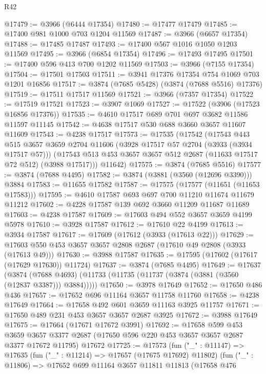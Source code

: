 \begin{lexlean}{R42}
\begin{coremodule}
@17479 := @3966 (@6444 @17354)
@17480 := @17477 @17479
@17485 := @17400 @981 @1000 @703 @1204 @11569
@17487 := @3966 (@6657 @17354)
@17488 := @17485 @17487
@17493 := @17400 @567 @1016 @1050 @1203 @11569
@17495 := @3966 (@6854 @17354)
@17496 := @17493 @17495
@17501 := @17400 @596 @413 @700 @1202 @11569
@17503 := @3966 (@7155 @17354)
@17504 := @17501 @17503
@17511 := @3941 @17376 @17354 @754 @1069 @703 @1201 @16856
@17517 := @3874 (@7685 @5428) (@3874 (@7688 @5516) @17376)
@17519 := @17511 @17517 @11569
@17521 := @3966 (@7357 @17354)
@17522 := @17519 @17521
@17523 := @3907 @1069
@17527 := @17522 (@3906 (@17523 @16856 @17376))
@17535 := @4610 @17517 @689 @701 @697 @3682 @11586 @11597 @11145
@17542 := @4638 @17517 @530 @688 @3660 @3657 @11607 @11609
@17543 := @4238 @17517
@17573 := @17535
    (@17542
      (@17543
        @443
        @515
        @3657
        @3659
        @2704
        @11606
        (@3928 @17517 @57 @2704 (@3933 (@3934 @17517 @57)))
        (@17543 @513 @453 @3657 @3657 @512 @2687 (@11633 @17517 @72 @512) (@3988 @17517)))
      @11642)
@17575 := @3874 (@7685 @5516)
@17577 := @3874 (@7688 @4495)
@17582 := @3874 (@3881 (@3560 (@12696 @3390))) @3884
@17583 := @11655 @17582
@17587 := @17575 (@17577 (@11651 (@11653 @17583)))
@17595 := @4610 @17587 @693 @697 @700 @11210 @11674 @11679 @11212
@17602 := @4228 @17587 @139 @692 @3660 @11209 @11687 @11689
@17603 := @4238 @17587
@17609 := @17603 @494 @552 @3657 @3659 @4199 @5978
@17610 := @3928 @17587
@17612 := @17610 @22 @4199
@17613 := @3934 @17587
@17617 := @17609 (@17612 (@3933 (@17613 @22)))
@17629 := @17603 @550 @453 @3657 @3657 @2808 @2687 (@17610 @49 @2808 (@3933 (@17613 @49)))
@17630 := @3988 @17587
@17635 := @17595 (@17602 (@17617 (@17629 @17630)) @11724)
@17637 := @3874 (@7685 @4495)
@17649 := @17637
    (@3874 (@7688 @4693) (@11733 (@11735 (@11737 (@3874 (@3881 (@3560 (@12837 @3387))) @3884)))))
@17650 := @3978 @17649
@17652 := @17650 @486 @436
@17657 := @17652 @696 @11164 @3657 @11758 @11760
@17658 := @4238 @17649
@17664 := @17658 @492 @601 @3659 @11163 @3925 @11757
@17671 := @17650 @489 @231 @453 @3657 @3657 @2687 @3925
@17672 := @3988 @17649
@17675 := @17664 (@17671 @17672 @3991)
@17692 := @17658
    @599
    @453
    @3659
    @3657
    @3377
    @2687
    (@17650 @596 @220 @453 @3657 @3657 @2687 @3377 @17672 @11795)
    @17672
@17725 := @17573
    (fun ("_" : @11147) =>
    @17635
      (fun ("_" : @11214) => @17657 (@17675 @17692) @11802)
      (fun ("_" : @11806) =>
      @17652
        @699
        @11164
        @3657
        @11811
        @11813
        (@17658
          @476

\end{coremodule}
\end{lexlean}
